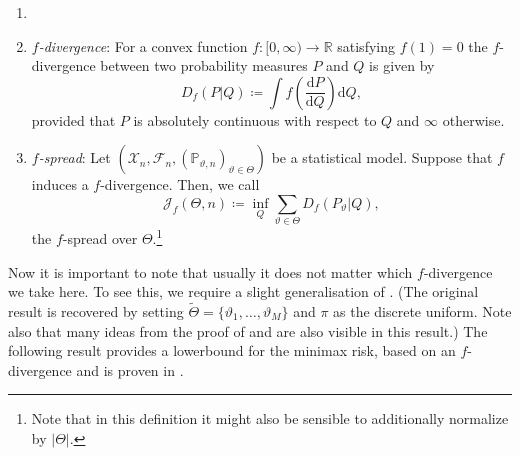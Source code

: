 \documentclass[a4paper]{article}
\begin{document}
\begin{definition}
	\label{definition:f_divergence}
	\begin{enumerate}
		\item[]
		\item \textit{$f$-divergence}: For a convex function $f:[0,\infty) \rightarrow \mathbb{R}$ satisfying $f(1)=0$ the $f$-divergence between two probability measures $P$ and $Q$ is given by
		      \begin{equation*}
			      D_f(P | Q) \coloneqq \int f \left(\frac{\mathrm{d}P}{\mathrm{d}Q}\right)\mathrm{d}Q,
		      \end{equation*}
		      provided that $P$ is absolutely continuous with respect to $Q$ and $\infty$ otherwise.
		\item \textit{$f$-spread}: Let $(\mathcal{X}_n, \mathcal{F}_n, (\mathbb{P}_{\vartheta,n})_{\vartheta \in \Theta})$ be a statistical model. Suppose that $f$ induces a $f$-divergence. Then, we call
		      \begin{equation}
			      \label{eq:f_spread}
			      \mathcal{J}_f(\Theta, n) \coloneqq \inf_{Q} \sum_{\vartheta \in \Theta} D_{f}(P_{\vartheta}|Q),
		      \end{equation}
		      the $f$-spread over $\Theta$.\footnote{Note that in this definition it might also be sensible to additionally normalize by $|\Theta|$.}
	\end{enumerate}
\end{definition}
Now it is important to note that usually it does not matter which $f$-divergence we take here. To see this, we require a slight generalisation of . (The original result is recovered by setting $\tilde{\Theta}=\{\vartheta_1, \dots, \vartheta_M\}$ and $\pi$ as the discrete uniform. Note also that many ideas from the proof of  and  are also visible in this result.) The following result provides a lowerbound for the minimax risk, based on an $f$-divergence and is proven in \cite[II.2]{guntuboyinaLowerBoundsMinimax2011}.
\end{document}
